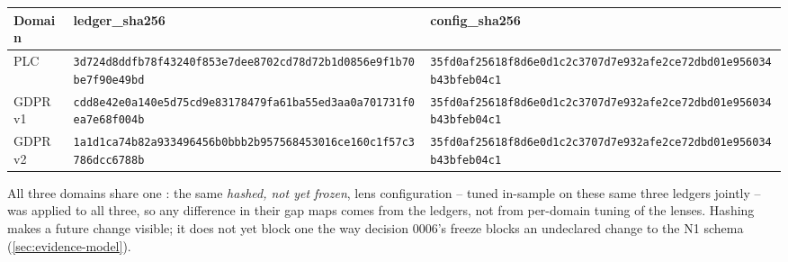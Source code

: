 \begin{center}
\footnotesize
\begin{tabular}{@{}l p{5.4cm} p{5.4cm}@{}}
  \toprule
  \textbf{Domain} & \textbf{ledger\_sha256} & \textbf{config\_sha256} \\
  \midrule
  PLC & \nolinkurl{3d724d8ddfb78f43240f853e7dee8702cd78d72b1d0856e9f1b70be7f90e49bd} &
    \nolinkurl{35fd0af25618f8d6e0d1c2c3707d7e932afe2ce72dbd01e956034b43bfeb04c1} \\
  GDPR v1 & \nolinkurl{cdd8e42e0a140e5d75cd9e83178479fa61ba55ed3aa0a701731f0ea7e68f004b} &
    \nolinkurl{35fd0af25618f8d6e0d1c2c3707d7e932afe2ce72dbd01e956034b43bfeb04c1} \\
  GDPR v2 & \nolinkurl{1a1d1ca74b82a933496456b0bbb2b957568453016ce160c1f57c3786dcc6788b} &
    \nolinkurl{35fd0af25618f8d6e0d1c2c3707d7e932afe2ce72dbd01e956034b43bfeb04c1} \\
  \bottomrule
\end{tabular}
\end{center}

All three domains share one : the same \emph{hashed, not yet frozen}, lens
configuration -- tuned in-sample on these same three ledgers jointly -- was applied to all three,
so any difference in their gap maps comes from the ledgers, not from per-domain tuning of the
lenses. Hashing makes a future change visible; it does not yet block one the way decision 0006's
freeze blocks an undeclared change to the N1 schema (\cref{sec:evidence-model}).

